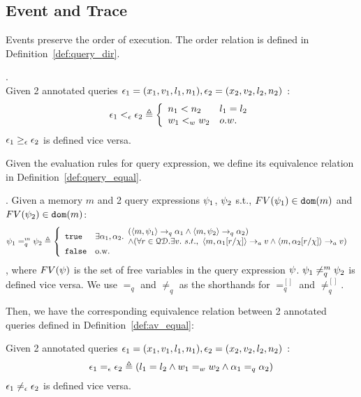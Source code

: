\subsection{Event and Trace}
%
%
Events preserve the order of execution. The order relation is defined in Definition~\ref{def:query_dir}.
%
\begin{defn}.
\label{def:query_dir}
\\
Given 2 annotated queries 
$\mathtt{\epsilon}_1 = (x_1, v_1, l_1, n_1), 
\mathtt{\epsilon}_2 = (x_2, v_2, l_2, n_2)$
:
%
\[
\event_1 \eventlt \event_2
 \triangleq 
 \left\{
 \begin{array}{ll}
    n_1 < n_2  
    & l_1 = l_2
    \\
    w_1 <_w w_2 & o.w.
\end{array}  
\right.
\]
%
$\mathtt{\epsilon}_1 \geq_{\mathtt{\epsilon}} \mathtt{\epsilon}_2$  is defined vice versa.
\end{defn}
%
%
%
Given the evaluation rules for query expression, we define its equivalence relation in Definition~\ref{def:query_equal}.
%
\begin{defn}.
%
\label{def:query_equal}
 Given a memory $m$ and 2 query expressions $\psi_1$, $\psi_2$ s.t., $FV(\psi_1) \in \mathtt{dom}(m)$ and $FV(\psi_2) \in \mathtt{dom}(m)$:
$$
\qexpr_1 =_{q}^{m} \qexpr_2 \triangleq
\left\{
    \begin{array}{ll} 
      \etrue      
      & 
    \exists \qval_1, \qval_2.
    \begin{array}{l} 
      (\config{m,  \qexpr_1} \qarrow \qval_1 \land \config{m,  \qexpr_2 } \qarrow \qval_2) 
      \\
      \land (\forall r \in \qdom. \exists v. ~ s.t., ~ 
            \config{m, \qval_1[r/\chi]} \aarrow v \land \config{m,  \qval_2[r/\chi] } \aarrow v)  
    \end{array}\\
      \efalse         
      & \text{o.w.} 
    \end{array}
    \right.
$$
%
, where $FV(\psi)$ is the set of free variables in the query expression $\psi$.
$\psi_1 \neq_{q}^{m} \psi_2$  is defined vice versa.
%
We use $=_{q}$  and $\neq_{q}$ as the shorthands for $=_{q}^{[]}$ and $\neq^{[]}_{q}$.
\end{defn}
%
Then, we have the corresponding equivalence relation between 2 annotated queries defined in Definition~\ref{def:av_equal}:
%
\begin{defn}
%
\label{def:av_equal}
Given 2 annotated queries 
$ \mathtt{\epsilon}_1 = (x_1, v_1, l_1, n_1), 
\mathtt{\epsilon}_2 = (x_2, v_2, l_2, n_2)$
:
%
\[
\mathtt{\epsilon}_1 =_{\mathtt{\epsilon}} \mathtt{\epsilon}_2
 \triangleq (l_1 = l_2 \land  w_1 =_w w_2 \land 
 \alpha_1 =_q \alpha_2) 
\]
%
$\mathtt{\epsilon}_1 \neq_{\mathtt{\epsilon}} \mathtt{\epsilon}_2$  is defined vice versa.
%
\end{defn}
